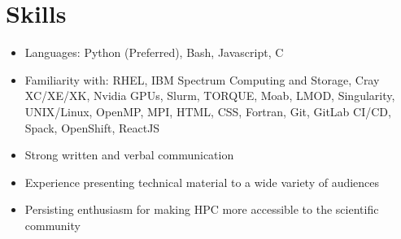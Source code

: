 \documentclass[letterpaper,11pt]{article}
\newcommand{\resumeItem}[1]{
  \item\small{
    {#1 \vspace{-2pt}}
  }
}
\newcommand{\resumeSubItem}[1]{\resumeItem{#1}\vspace{-4pt}}
\newcommand{\resumeSubHeadingListStart}{\begin{itemize}[leftmargin=*]}
\newcommand{\resumeSubHeadingListEnd}{\end{itemize}}
\begin{document}
\section{Skills}
  \resumeSubHeadingListStart
    \resumeSubItem{Languages: Python (Preferred), Bash, Javascript, C}

    \resumeSubItem{Familiarity with: RHEL, IBM Spectrum Computing and Storage, Cray XC/XE/XK, Nvidia GPUs, Slurm, TORQUE, Moab, LMOD, Singularity, UNIX/Linux, OpenMP, MPI, HTML, CSS, Fortran, Git, GitLab CI/CD, Spack, OpenShift, ReactJS}
    
    \resumeSubItem{Strong written and verbal communication}
    
    \resumeSubItem{Experience presenting technical material to a wide variety of audiences}
    
    \resumeSubItem{Persisting enthusiasm for making HPC more accessible to the scientific community}
    
  \resumeSubHeadingListEnd


\end{document}

